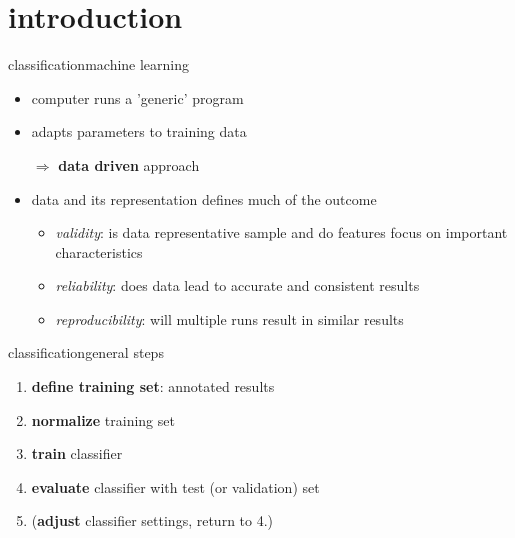     \section[intro]{introduction}
        \begin{frame}{classification}{machine learning}
            \begin{itemize}
                \item   computer runs a 'generic' program
                \item   adapts parameters to training data
                \bigskip
                \item[$\Rightarrow$] \textbf{data driven} approach
                
                \bigskip
                \item<2->[] data and its representation defines much of the outcome
                    \begin{itemize}
                        \item   \textit{validity}: is data representative sample and do features focus on important characteristics
                        \item   \textit{reliability}: does data lead to accurate and consistent results
                        \item   \textit{reproducibility}: will multiple runs result in similar results
                    \end{itemize}
            \end{itemize}
        \end{frame}
        \begin{frame}{classification}{general steps}
            \begin{enumerate}
                \item	\textbf{define training set}: annotated results
                \smallskip
                \item<2->	\textbf{normalize} training set
                \smallskip
                \item<3->	\textbf{train} classifier
                \smallskip
                \item<4->	\textbf{evaluate} classifier with test (or validation) set
                \smallskip
                \item<5->	(\textbf{adjust} classifier settings, return to 4.)
            \end{enumerate}
        \end{frame}
        
